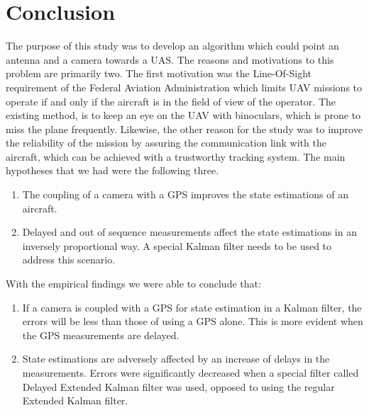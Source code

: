 \chapter{Conclusion}
\label{ch:conclusion}




The purpose of this study was to develop an algorithm which could point an antenna and a camera towards a UAS. The reasons and motivations to this problem are primarily two. The first motivation was the Line-Of-Sight requirement of the Federal Aviation Administration which limits UAV missions to operate if and only if the aircraft is in the field of view of the operator. The existing method, is to keep an eye on the UAV with binoculars, which is prone to miss the plane frequently. Likewise, the other reason for the study was to improve the reliability of the mission by assuring the communication link with the aircraft, which can be achieved with a trustworthy tracking system. \linebreak
\linebreak
The main hypotheses that we had were the following three.
\begin{enumerate}
\item The coupling of a camera with a GPS improves the state estimations of an aircraft.
\item Delayed and out of sequence measurements affect the state estimations in an inversely proportional way. A special Kalman filter needs to be used to address this scenario.
\end{enumerate}
With the empirical findings we were able to conclude that:
\begin{enumerate}
\item If a camera is coupled with a GPS for state estimation in a Kalman filter, the errors will be less than those of using a GPS alone. This is more evident when the GPS measurements are delayed.
\item State estimations are adversely affected by an increase of delays in the measurements. Errors were significantly decreased when a special filter called Delayed Extended Kalman filter was used, opposed to using the regular Extended Kalman filter.
\end{enumerate}
\pagebreak

